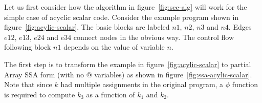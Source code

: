 Let us first consider how the algorithm in
figure~\ref{fig:scc-alg} will work for the simple case of acyclic scalar code.  Consider the example program shown in figure~\ref{fig:acylic-scalar}. The
basic
blocks are labeled
$n1$, $n2$, $n3$ and $n4$. Edges $e12$, $e13$, $e24$ and
$e34$ connect nodes in the obvious way. The control flow
following block $n1$ depends on the value of variable
$n$. 


The first step is to transform the example in
figure~\ref{fig:acylic-scalar} to partial
Array SSA form (with no @ variables) as shown in
figure~\ref{fig:ssa-acylic-scalar}. Note that since $k$ had
multiple assignments in the original program, a $\phi$ function is
required to compute $k_3$ as a function of $k_1$ and $k_2$. 



